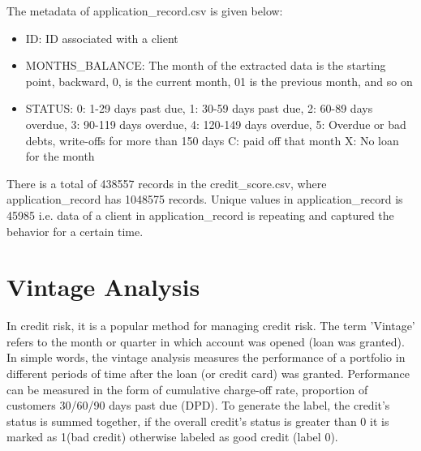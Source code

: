 \documentclass[10pt]{article}
\begin{document}
\begin{multicols}{2}
The metadata of application\_record.csv is given below:

\begin{itemize}[itemsep=0pt]
    \item ID: ID associated with a client
    \item MONTHS\_BALANCE: The month of the extracted data is the starting point, backward, 0, is the current month, 01 is the previous month, and so on
    \item STATUS: 0: 1-29 days past due, 1: 30-59 days past due, 2: 60-89 days overdue, 3: 90-119 days overdue, 4: 120-149 days overdue, 5: Overdue or bad debts, write-offs for more than 150 days C: paid off that month X: No loan for the month
    \end{itemize}

There is a total of 438557 records in the credit\_score.csv, where application\_record has 1048575 records. Unique values in application\_record is 45985 i.e. data of a client in application\_record is repeating and captured the behavior for a certain time.


\section{Vintage Analysis}

In credit risk, it is a popular method for managing credit risk. The term 'Vintage' refers to the month or quarter in which account was opened (loan was granted). In simple words, the vintage analysis measures the performance of a portfolio in different periods of time after the loan (or credit card) was granted. Performance can be measured in the form of cumulative charge-off rate, proportion of customers 30/60/90 days past due (DPD). To generate the label, the credit’s status is summed together, if the overall credit’s status is greater than 0 it is marked as 1(bad credit) otherwise labeled as good credit (label 0). 


\end{multicols}
\end{document}

